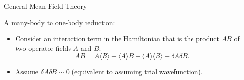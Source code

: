 \documentclass{beamer}
\begin{document}
\begin{frame}{General Mean Field Theory}
    
    A many-body to one-body reduction:

    \begin{itemize}
        \item Consider an interaction term in the Hamiltonian that is the product $AB$ of two operator fields $A$ and $B$:
        \[
            AB = A\langle B\rangle + \langle A\rangle B - \langle A\rangle \langle B\rangle +\delta A \delta B.
        \]
        
        \item Assume $\delta A \delta B\sim 0$ (equivalent to assuming trial wavefunction).
        
        
        
        
    \end{itemize}
    
\end{frame}




\end{document}
